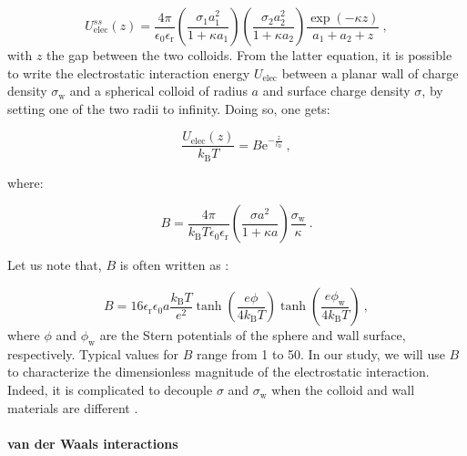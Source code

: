 \begin{equation}
	U_\textrm{elec} ^{ss}(z) = \frac{4\pi}{\epsilon_0 \epsilon_\mathrm{r}} 
	\left(
	\frac{\sigma_1 a_1 ^2}{1 + \kappa a_1}
	\right)
	\left(
	\frac{\sigma_2 a_2 ^2}{1 + \kappa a_2}
	\right)
	\frac{\exp(-\kappa z)}{a_1 + a_2 + z} ~,
\end{equation} 
with $z$ the gap between the two colloids.
From the latter equation, it is possible to write the electrostatic interaction energy $U_\textrm{elec}$ between a planar wall of charge density $\sigma_\textrm{w}$ and a spherical colloid of radius $a$ and surface charge density $\sigma$, by setting one of the two radii to infinity. Doing so, one gets:

\begin{equation}
	\frac{U_\textrm{elec}(z)}{k_\mathrm{B}T}  = B \mathrm{e}^{-\frac{z}{\ell_\mathrm{D}}}~,
	\label{Eq:Uelec}
\end{equation}

where:

\begin{equation}
	B = \frac{4 \pi}{ k_\mathrm{B}T\epsilon_0 \epsilon_\mathrm{r}} \left( \frac{\sigma a^2 }{1 + \kappa a}  \right) \frac{\sigma_\mathrm{w}}{\kappa} ~.
\end{equation}

Let us note that, $B$ is often written as \cite{behrens_charge_2001}:

\begin{equation}
	B = 16 \epsilon_\mathrm{r} \epsilon_0 a \frac{ k_\mathrm{B}T }{e^2} \tanh \left(\frac{e\phi}{4k_\mathrm{B}T}\right) \tanh \left(\frac{e\phi_\mathrm{w}}{4k_\mathrm{B}T}\right) ~,
\end{equation}
where $\phi$ and $\phi_\mathrm{w}$ are the Stern potentials of the sphere and wall surface, respectively. Typical values for $B$ range from 1 to 50. In our study, we will use $B$  to characterize the dimensionless magnitude of the electrostatic interaction. Indeed, it is complicated to decouple $\sigma$ and $\sigma_\mathrm{w}$ when the colloid and wall materials are different \cite{behrens_charge_2001}.

\paragraph{van der Waals interactions}\mbox{}\\
\vspace{0.10cm}

